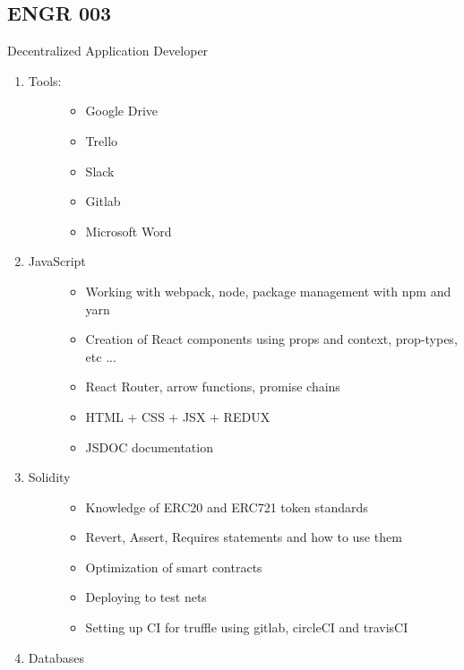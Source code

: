 \subsection{ENGR 003} 

Decentralized Application Developer

\begin{enumerate}
\def\labelenumi{\arabic{enumi}.}
\item
  \begin{description}
  \item[Tools:]
  \begin{itemize}
  
  \item
    Google Drive
  \item
    Trello
  \item
    Slack
  \item
    Gitlab
  \item
    Microsoft Word
  \end{itemize}
  \end{description}
\item
  \begin{description}
  \item[JavaScript]
  \begin{itemize}
  
  \item
    Working with webpack, node, package management with npm and yarn
  \item
    Creation of React components using props and context, prop-types,
    etc ...
  \item
    React Router, arrow functions, promise chains
  \item
    HTML + CSS + JSX + REDUX
  \item
    JSDOC documentation
  \end{itemize}
  \end{description}
\item
  \begin{description}
  \item[Solidity]
  \begin{itemize}
  
  \item
    Knowledge of ERC20 and ERC721 token standards
  \item
    Revert, Assert, Requires statements and how to use them
  \item
    Optimization of smart contracts
  \item
    Deploying to test nets
  \item
    Setting up CI for truffle using gitlab, circleCI and travisCI
  \end{itemize}
  \end{description}
\item
  \begin{description}
  \item[Databases]
  \begin{itemize}
  

\end{itemize}
\end{description}
\end{enumerate}
